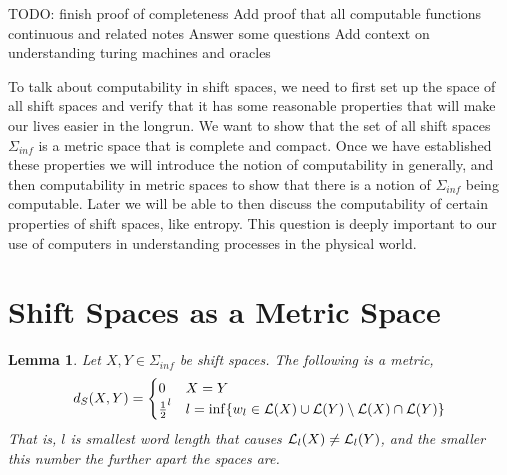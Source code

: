 \documentclass[11pt, reqno]{amsart}
\theoremstyle{plain}
\newtheorem{lemma}[thm]{Lemma}
\theoremstyle{definition}
\begin{document}
TODO: finish proof of completeness
Add proof that all computable functions continuous and related notes
Answer some questions
Add context on understanding turing machines and oracles

To talk about computability in shift spaces, we need to first set up the space of all shift spaces and verify that it has some reasonable properties that will make our lives easier in the longrun. We want to show that the set of all shift spaces $\Sigma_{inf}$ is a metric space that is complete and compact. Once we have established these properties we will introduce the notion of computability in generally, and then computability in metric spaces to show that there is a notion of $\Sigma_{inf}$ being computable. Later we will be able to then discuss the computability of certain properties of shift spaces, like entropy. This question is deeply important to our use of computers in understanding processes in the physical world.

\section{Shift Spaces as a Metric Space}
\begin{lemma}
    Let $X, Y \in \Sigma_{inf}$ be shift spaces. The following is a metric, 
    $$d_S(X,Y) = \begin{cases}
        0 & X = Y \\ 
        \frac{1}{2}^l & l = \inf \{w_l \in \mathcal{L}(X) \cup \mathcal{L}(Y) \setminus \mathcal{L}(X) \cap \mathcal{L}(Y)\}
    \end{cases}$$
    That is, $l$ is smallest word length that causes $\mathcal{L}_l(X) \neq \mathcal{L}_l(Y)$, and the smaller this number the further apart the spaces are.
\end{lemma}
\end{document}
